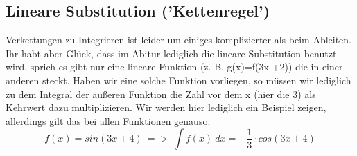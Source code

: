 \subsection{Lineare Substitution ('Kettenregel')}
Verkettungen zu Integrieren ist leider um einiges komplizierter als beim Ableiten. Ihr habt aber Glück, dass im Abitur lediglich die lineare Substitution benutzt wird, sprich es gibt nur eine lineare Funktion (z. B. g(x)=f(3x +2)) die in einer anderen steckt. Haben wir eine solche Funktion vorliegen, so müssen wir lediglich zu dem Integral der äußeren Funktion die Zahl vor dem x (hier die 3) als Kehrwert dazu multiplizieren. Wir werden hier lediglich ein Beispiel zeigen, allerdings gilt das bei allen Funktionen genauso:
\[f(x)=sin(3x+4)\ =>\ \int f(x)\ dx=-\frac{1}{3}\cdot cos(3x+4)\]
